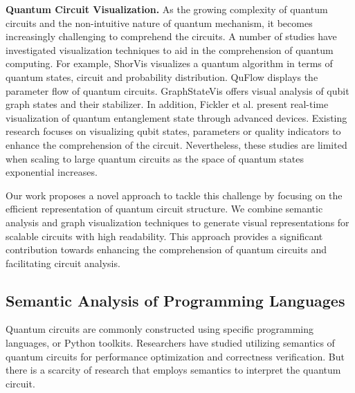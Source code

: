 \textbf{Quantum Circuit Visualization.}
As the growing complexity of quantum circuits and the non-intuitive nature of quantum mechanism, it becomes increasingly challenging to comprehend the circuits.
A number of studies have investigated visualization techniques to aid in the comprehension of quantum computing.
For example, ShorVis\cite{Tao:2017:ShorVis} visualizes a quantum algorithm in terms of quantum states, circuit and probability distribution. 
QuFlow\cite{Lin:2018:QuFlow} displays the parameter flow of quantum circuits.
GraphStateVis\cite{Miller:2021:GSV} offers visual analysis of qubit graph states and their stabilizer.
In addition, Fickler et al.\cite{Fickler:2013:RIQE} present real-time visualization of quantum entanglement state through advanced devices. 
Existing research focuses on visualizing qubit states, parameters or quality indicators to enhance the comprehension of the circuit.
Nevertheless, these studies are limited when scaling to large quantum circuits as the space of quantum states exponential increases.

Our work proposes a novel approach to tackle this challenge by focusing on the efficient representation of quantum circuit structure. We combine semantic analysis and graph visualization techniques to generate visual representations for scalable circuits with high readability. This approach provides a significant contribution towards enhancing the comprehension of quantum circuits and facilitating circuit analysis.

\subsection{Semantic Analysis of Programming Languages}
Quantum circuits are commonly constructed using specific programming languages\cite{Svore:2018:QSharp, JavadiAbhari:2014:ScaffCC, Green:2013:Quipper}, or Python toolkits\cite{Qiskit, Cirq}.
Researchers have studied utilizing semantics of quantum circuits for performance optimization and correctness verification\cite{Xu:2022:Quartz, Tao:2022:Giallar}.
But there is a scarcity of research that employs semantics to interpret the quantum circuit.

